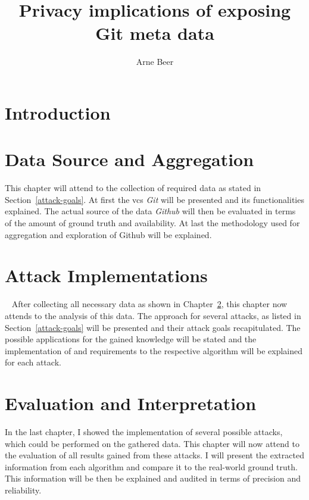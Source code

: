 \documentclass{thesis}
\title{Privacy implications of exposing Git meta data}
\author{Arne Beer}
\begin{document}

\cleardoublepage{}


\clearpage



{\small \tableofcontents}



\chapter{Introduction}




\chapter{Data Source and Aggregation}\label{data}
This chapter will attend to the collection of required data as stated in Section~\ref{attack-goals}.
At first the \ac{vcs} \emph{Git} will be presented and its functionalities explained.
The actual source of the data \emph{Github} will then be evaluated in terms of the amount of ground truth and availability.
At last the methodology used for aggregation and exploration of Github will be explained.








\chapter{Attack Implementations}~\label{implementation}
After collecting all necessary data as shown in Chapter~\ref{data}, this chapter now attends to the analysis of this data.
The approach for several attacks, as listed in Section~\ref{attack-goals} will be presented and their attack goals recapitulated.
The possible applications for the gained knowledge will be stated and the implementation of and requirements to the respective algorithm will be explained for each attack.







\chapter{Evaluation and Interpretation}\label{evaluation}
In the last chapter, I showed the implementation of several possible attacks, which could be performed on the gathered data.
This chapter will now attend to the evaluation of all results gained from these attacks.
I will present the extracted information from each algorithm and compare it to the real-world ground truth.
This information will be then be explained and audited in terms of precision and reliability.
\end{document}
